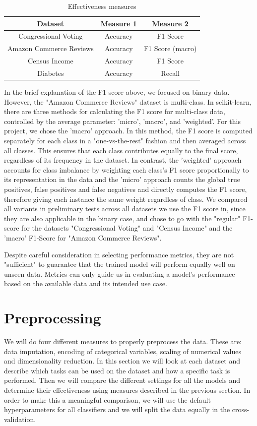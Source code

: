 \documentclass[a4paper,10pt]{article}
\begin{document}
\begin{table}[h]
\centering
\begin{tabular}{|c|c|c|}
\hline
Dataset & Measure 1 & Measure 2 \\ \hline
Congressional Voting & Accuracy & F1 Score \\ 
Amazon Commerce Reviews & Accuracy & F1 Score (macro) \\ 
Census Income & Accuracy & F1 Score \\ 
Diabetes & Accuracy & Recall \\ \hline
\end{tabular}
\caption{Effectiveness measures}
\label{tab:effectiveness_measures}
\end{table}
In the brief explanation of the F1 score above, we focused on binary data. However, the "Amazon Commerce Reviews" dataset is multi-class. In scikit-learn, there are three methods for calculating the F1 score for multi-class data, controlled by the average parameter: 'micro', 'macro', and 'weighted'. For this project, we chose the 'macro' approach. In this method, the F1 score is computed separately for each class in a "one-vs-the-rest" fashion and then averaged across all classes. This ensures that each class contributes equally to the final score, regardless of its frequency in the dataset. In contrast, the 'weighted' approach accounts for class imbalance by weighting each class's F1 score proportionally to its representation in the data {\color{red}and the 'micro' approach counts the global true positives, false positives and false negatives and directly computes the F1 score, therefore giving each instance the same weight regardless of class.} We compared all variants in preliminary tests across all datasets we use the F1 score in, since they are also applicable in the binary case, and chose to go with the "regular" F1-score for the datasets "Congressional Voting" and "Census Income" and the 'macro' F1-Score for "Amazon Commerce Reviews".

Despite careful consideration in selecting performance metrics, they are not "sufficient" to guarantee that the trained model will perform equally well on unseen data. Metrics can only guide us in evaluating a model's performance based on the available data and its intended use case.

\section{Preprocessing}
\label{sec:preprocessing}
We will do four different measures to properly preprocess the data. These are: data imputation, encoding of categorical variables,
scaling of numerical values and dimensionality reduction. In this section we will look at each dataset and 
describe which tasks can be used on the dataset and how a specific task is performed. Then we will compare the different
settings for all the models and determine their effectiveness using measures described in the previous section. 
In order to make this a meaningful comparison, we will use the default hyperparameters for all classifiers and 
we will split the data equally in the cross-validation.
\end{document}
